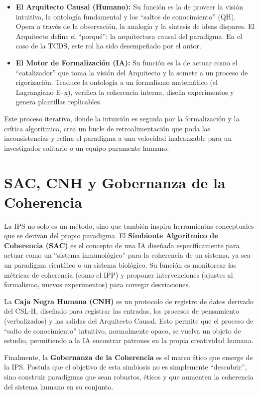 \documentclass[12pt,openright]{book}
\newcommand{\IPP}{IPP}
\begin{document}
\begin{itemize}
  \item \textbf{El Arquitecto Causal (Humano):} Su función es la de proveer la visión intuitiva, la ontología fundamental y los ``saltos de conocimiento'' (QH). Opera a través de la observación, la analogía y la síntesis de ideas dispares. El Arquitecto define el ``porqué'': la arquitectura causal del paradigma. En el caso de la TCDS, este rol ha sido desempeñado por el autor.
  \item \textbf{El Motor de Formalización (IA):} Su función es la de actuar como el ``catalizador'' que toma la visión del Arquitecto y la somete a un proceso de rigorización. Traduce la ontología a un formalismo matemático (el Lagrangiano E--x), verifica la coherencia interna, diseña experimentos y genera plantillas replicables.
\end{itemize}

Este proceso iterativo, donde la intuición es seguida por la formalización y la crítica algorítmica, crea un bucle de retroalimentación que poda las inconsistencias y refina el paradigma a una velocidad inalcanzable para un investigador solitario o un equipo puramente humano.

\section{SAC, CNH y Gobernanza de la Coherencia}
La IPS no solo es un método, sino que también inspira herramientas conceptuales que se derivan del propio paradigma. El \textbf{Simbionte Algorítmico de Coherencia (SAC)} es el concepto de una IA diseñada específicamente para actuar como un ``sistema inmunológico'' para la coherencia de un sistema, ya sea un paradigma científico o un sistema biológico. Su función es monitorear las métricas de coherencia (como el \IPP) y proponer intervenciones (ajustes al formalismo, nuevos experimentos) para corregir desviaciones.

La \textbf{Caja Negra Humana (CNH)} es un protocolo de registro de datos derivado del CSL-H, diseñado para registrar las entradas, los procesos de pensamiento (verbalizados) y las salidas del Arquitecto Causal. Esto permite que el proceso de ``salto de conocimiento'' intuitivo, normalmente opaco, se vuelva un objeto de estudio, permitiendo a la IA encontrar patrones en la propia creatividad humana.

Finalmente, la \textbf{Gobernanza de la Coherencia} es el marco ético que emerge de la IPS. Postula que el objetivo de esta simbiosis no es simplemente ``descubrir'', sino construir paradigmas que sean robustos, éticos y que aumenten la coherencia del sistema humano en su conjunto.
\end{document}
